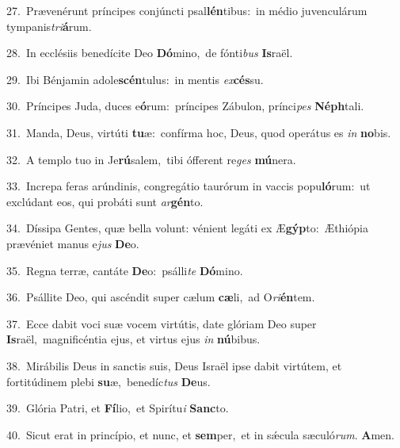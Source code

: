 {\numbfont\textcolor{\numbcolor}{27.}}~Prævenérunt príncipes conjúncti psal\-\textbf{lén}\-tibus:~\star in médio juvenculárum tympanis\-\textit{tri}\-\textbf{á}rum.\par
{\numbfont\textcolor{\numbcolor}{28.}}~In ecclésiis benedícite Deo \textbf{Dó}\-mino,~\star de fónti\textit{bus} \textbf{Is}\-raël.\par
{\numbfont\textcolor{\numbcolor}{29.}}~Ibi Bénjamin adole\-\textbf{scén}\-tulus:~\star in mentis \textit{ex}\-\textbf{cés}su.\par
{\numbfont\textcolor{\numbcolor}{30.}}~Príncipes Juda, duces e\-\textbf{ó}\-rum:~\star príncipes Zábulon, prínci\textit{pes} \textbf{Néph}\-tali.\par
{\numbfont\textcolor{\numbcolor}{31.}}~Manda, Deus, virtúti \textbf{tu}\-æ:~\star confírma hoc, Deus, quod operátus es \textit{in} \textbf{no}\-bis.\par
{\numbfont\textcolor{\numbcolor}{32.}}~A templo tuo in Je\-\textbf{rú}\-salem,~\star tibi ófferent re\textit{ges} \textbf{mú}\-nera.\par
{\numbfont\textcolor{\numbcolor}{33.}}~Increpa feras arúndinis, congregátio taurórum in vaccis popu\-\textbf{ló}\-rum:~\star ut exclúdant eos, qui probáti sunt \textit{ar}\-\textbf{gén}to.\par
{\numbfont\textcolor{\numbcolor}{34.}}~Díssipa Gentes, quæ bella volunt: vénient legáti ex Æ\-\textbf{gýp}\-to:~\star Æthiópia prævéniet manus e\textit{jus} \textbf{De}\-o.\par
{\numbfont\textcolor{\numbcolor}{35.}}~Regna terræ, cantáte \textbf{De}\-o:~\star psálli\textit{te} \textbf{Dó}\-mino.\par
{\numbfont\textcolor{\numbcolor}{36.}}~Psállite Deo, qui ascéndit super cælum \textbf{cæ}\-li,~\star ad O\-\textit{ri}\-\textbf{én}tem.\par
{\numbfont\textcolor{\numbcolor}{37.}}~Ecce dabit voci suæ vocem virtútis, date glóriam Deo super \textbf{Is}\-raël,~\star magnificéntia ejus, et virtus ejus \textit{in} \textbf{nú}\-bibus.\par
{\numbfont\textcolor{\numbcolor}{38.}}~Mirábilis Deus in sanctis suis, Deus Israël ipse dabit virtútem, et fortitúdinem plebi \textbf{su}\-æ,~\star benedíc\textit{tus} \textbf{De}\-us.\par
{\numbfont\textcolor{\numbcolor}{39.}}~Glória Patri, et \textbf{Fí}\-lio,~\star et Spirítu\textit{i} \textbf{Sanc}\-to.\par
{\numbfont\textcolor{\numbcolor}{40.}}~Sicut erat in princípio, et nunc, et \textbf{sem}\-per,~\star et in sǽcula sæculó\-\textit{rum}\-. \textbf{A}\-men.\par
